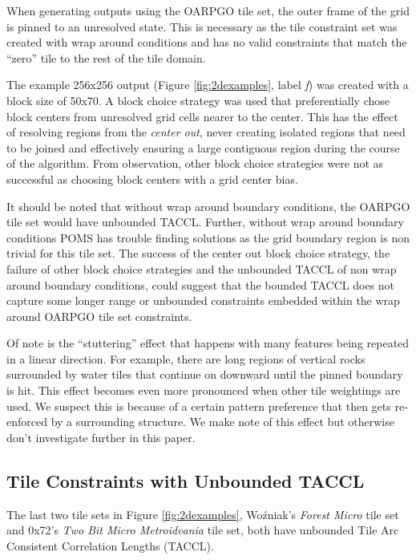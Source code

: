 When generating outputs using the OARPGO tile set, the outer frame of the grid is pinned to an unresolved state.
This is necessary as the tile constraint set was created with wrap around conditions and has no valid constraints that match the ``zero'' tile
to the rest of the tile domain.

The example 256x256 output (Figure \ref{fig:2dexamples}, label \textit{f})
was created with a block size of 50x70.
A block choice strategy was used that preferentially chose block centers from unresolved grid cells
nearer to the center.
This has the effect of resolving regions from the \textit{center out}, never creating isolated regions that need to be joined and effectively
  ensuring a large contiguous region during the course of the algorithm.
From observation, other block choice strategies were not as successful as choosing block centers with a grid center bias.

It should be noted that without wrap around boundary conditions, the OARPGO tile set would have unbounded TACCL.
Further, without wrap around boundary conditions POMS has trouble finding solutions as the
grid boundary region is non trivial for this tile set.
The success of the center out block choice strategy, the failure of other block choice strategies and the unbounded TACCL of
non wrap around boundary conditions, could suggest that the bounded TACCL does not capture some longer range or unbounded constraints
  embedded within the wrap around OARPGO tile set constraints.

Of note is the ``stuttering'' effect that happens with many features being repeated in a linear direction.
For example, there are long regions of vertical rocks surrounded by water tiles that continue on downward until the
pinned boundary is hit.
This effect becomes even more pronounced when other tile weightings are used.
We suspect this is because of a certain pattern preference that then gets re-enforced
by a surrounding structure.
We make note of this effect but otherwise don't investigate further in this paper.

\subsection{Tile Constraints with Unbounded TACCL}

The last two tile sets in Figure \ref{fig:2dexamples}, Wo\'zniak's \textit{Forest Micro} tile set and 0x72's \textit{Two Bit Micro Metroidvania} tile set,
both have unbounded Tile Arc Consistent Correlation Lengths (TACCL).

